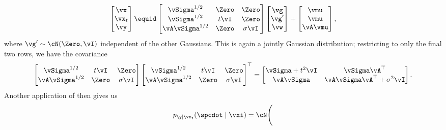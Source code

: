\documentclass[../../book-main.tex]{subfiles}
\begin{document}
\begin{example}
\begin{equation}
        \begin{bmatrix}
            \vx \\
            \vx_t \\
            \vy
        \end{bmatrix}
        \equid
        \begin{bmatrix}
            \vSigma^{1/2} & \Zero & \Zero \\
            \vSigma^{1/2} & t\vI & \Zero \\
            \vA \vSigma^{1/2} & \Zero & \sigma \vI
        \end{bmatrix}
        \begin{bmatrix}
            \vg \\
            \vg' \\
            \vw
        \end{bmatrix}
        +
        \begin{bmatrix}
            \vmu \\
            \vmu \\
            \vA\vmu
        \end{bmatrix},
    \end{equation}
    where $\vg' \sim \cN(\Zero, \vI)$ independent of the other Gaussians.
    This is again a jointly Gaussian distribution; restricting to only the final
    two rows, we have the covariance
    \begin{equation*}
        \begin{bmatrix}
            \vSigma^{1/2} & t\vI & \Zero \\
            \vA \vSigma^{1/2} & \Zero & \sigma \vI
        \end{bmatrix}
        \begin{bmatrix}
            \vSigma^{1/2} & t\vI & \Zero \\
            \vA \vSigma^{1/2} & \Zero & \sigma \vI
        \end{bmatrix}^\top
        =
        \begin{bmatrix}
            \vSigma + t^2\vI & \vSigma\vA^\top \\
            \vA\vSigma & \vA\vSigma\vA^\top + \sigma^2 \vI
        \end{bmatrix}.
    \end{equation*}
    Another application of  then gives us
    \begin{equation}
        \begin{split}
            p_{\y \mid \vx_t}(\spcdot \mid \vxi) = \cN\Biggl(

\end{split}
\end{equation}
\end{example}
\end{document}
